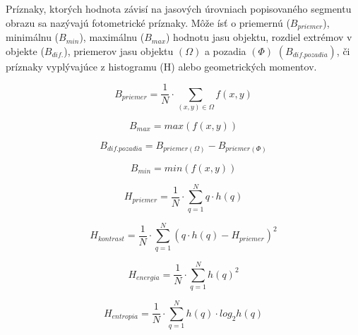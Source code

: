         Príznaky, ktorých hodnota závisí na jasových úrovniach popisovaného segmentu obrazu sa nazývajú fotometrické príznaky. Môže ísť o priemernú (\(B_{priemer}\)), minimálnu (\(B_{min}\)), maximálnu (\(B_{max}\)) hodnotu jasu objektu, rozdiel extrémov v objekte (\(B_{dif.}\)), priemerov jasu objektu \((\Omega)\) a pozadia \((\Phi)\) \((B_{dif. pozadia})\), či príznaky vyplývajúce z histogramu (H) alebo geometrických momentov.

        \begin{figure}[!ht]
            \centering
            \begin{minipage}[b]{0.45\textwidth}
                \[
                    B_{priemer} = \frac{1}{N} \cdot \sum_{(x,y) \in \Omega} f(x,y)
                \]
            \end{minipage}
            \begin{minipage}[b]{0.45\textwidth}
                \[
                    B_{max} = max(f(x,y))
                \]
            \end{minipage}
            \begin{minipage}[b]{0.45\textwidth}
                \[
                    B_{dif. pozadia} = B_{priemer(\Omega)} - B_{priemer(\Phi)} 
                \]
            \end{minipage}
            \begin{minipage}[b]{0.45\textwidth}
                \[
                    B_{min} = min(f(x,y))
                \]
            \end{minipage}
            \begin{minipage}[b]{0.45\textwidth}
                \[
                    H_{priemer} = \frac{1}{N} \cdot \sum_{q=1}^{N} q \cdot h(q)
                \]
            \end{minipage}
            \begin{minipage}[b]{0.5\textwidth}
                \[
                    H_{kontrast} = \frac{1}{N} \cdot \sum_{q=1}^{N} (q \cdot h(q) - H_{priemer})^2
                \]
            \end{minipage}
            \begin{minipage}[b]{0.45\textwidth}
                \[
                    H_{energia} = \frac{1}{N} \cdot \sum_{q=1}^{N} h(q)^2
                \]
            \end{minipage}
            \begin{minipage}[b]{0.45\textwidth}
                \[
                    H_{entropia} = \frac{1}{N} \cdot \sum_{q=1}^{N} h(q) \cdot log_2h(q)
                \]
            \end{minipage}
        \end{figure}

